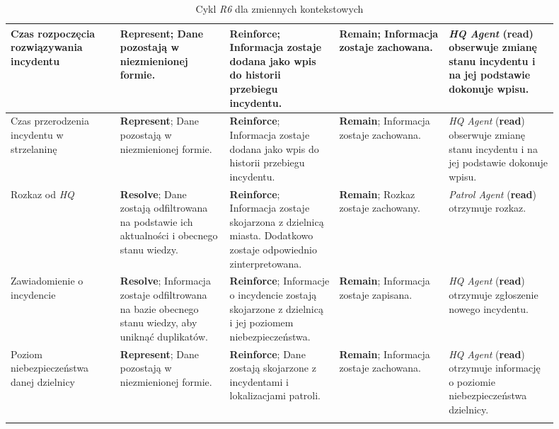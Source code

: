 \begin{landscape}
\begin{longtable}{|p{0.18\linewidth}|p{0.18\linewidth}|p{0.18\linewidth}|p{0.18\linewidth}|p{0.18\linewidth}|}
     \hline
     Czas rozpoczęcia rozwiązywania incydentu & \textbf{Represent}; Dane pozostają w niezmienionej formie. & \textbf{Reinforce}; Informacja zostaje dodana jako wpis do historii przebiegu incydentu. & \textbf{Remain}; Informacja zostaje zachowana. & \emph{HQ Agent} (\textbf{read}) obserwuje zmianę stanu incydentu i na jej podstawie dokonuje wpisu. \\
     \hline
     Czas przerodzenia incydentu w strzelaninę & \textbf{Represent}; Dane pozostają w niezmienionej formie. & \textbf{Reinforce}; Informacja zostaje dodana jako wpis do historii przebiegu incydentu. & \textbf{Remain}; Informacja zostaje zachowana. & \emph{HQ Agent} (\textbf{read}) obserwuje zmianę stanu incydentu i na jej podstawie dokonuje wpisu. \\
     \hline
     Rozkaz od \emph{HQ}  & \textbf{Resolve}; Dane zostają odfiltrowana na podstawie ich aktualności i obecnego stanu wiedzy. & \textbf{Reinforce}; Informacja zostaje skojarzona z dzielnicą miasta. Dodatkowo zostaje odpowiednio zinterpretowana. & \textbf{Remain}; Rozkaz zostaje zachowany. & \emph{Patrol Agent} (\textbf{read}) otrzymuje rozkaz. \\
     \hline
     Zawiadomienie o incydencie  & \textbf{Resolve}; Informacja zostaje odfiltrowana na bazie obecnego stanu wiedzy, aby uniknąć duplikatów. & \textbf{Reinforce}; Informacje o incydencie zostają skojarzone z dzielnicą i jej poziomem niebezpieczeństwa. & \textbf{Remain}; Informacja zostaje zapisana. & \emph{HQ Agent} (\textbf{read}) otrzymuje zgłoszenie nowego incydentu. \\
     \hline
      Poziom niebezpieczeństwa danej dzielnicy &  \textbf{Represent}; Dane pozostają w niezmienionej formie. & \textbf{Reinforce}; Dane zostają skojarzone z incydentami i lokalizacjami patroli. & \textbf{Remain}; Informacja zostaje zachowana. & \emph{HQ Agent} (\textbf{read}) otrzymuje informację o poziomie niebezpieczeństwa dzielnicy. \\
      \hline
    \caption{Cykl \emph{R6} dla zmiennych kontekstowych}
    \label{tab:r6CycleForContextData}
    \end{longtable}
\end{landscape}


